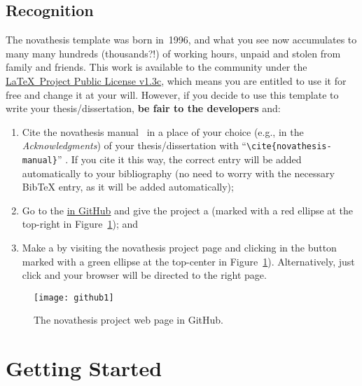\subsection{Recognition}
\label{sub:recognition}

\ntindex[Recognition]{}

The \gls{novathesis} template was born in~1996, and what you see now accumulates to many many hundreds (thousands?!) of working hours, unpaid and stolen from family and friends.  This work is available to the community under the \href{LaTeX project public license}{\LaTeX\ Project Public License v1.3c}, which means you are entitled to use it for free and change it at your will.  However, if you decide to use this template to write your thesis/dissertation, \textbf{be fair to the developers} and:
\begin{enumerate}
  \item {} Cite the \gls{novathesis} manual~\cite{novathesis-manual} in a place of your choice (e.g., in the \emph{Acknowledgments}) of your thesis/dissertation with “\verb!\cite{novathesis-manual}!” .  If you cite it this way, the correct entry will be added automatically to your bibliography (no need to worry with the necessary BibTeX entry, as it will be added automatically);
  \item Go to the
\href{https://github.com/joaomlourenco/novathesis}{ in GitHub} and give the project a  (marked with a red ellipse at the top-right in Figure~\ref{fig:github}); and
  \item Make a  by visiting the \gls{novathesis} project page and clicking in the button marked with a green ellipse at the top-center in Figure~\ref{fig:github}).  Alternatively, just click \href{https://www.paypal.com/donate/?hosted_button_id=8WA8FRVMB78W8}{} and your browser will be directed to the right page.
\end{enumerate}

\begin{figure}[htbp]
    \centering
    \texttt{[image: github1]}
    \caption{The \gls{novathesis} project web page in GitHub.}
    \label{fig:github}
\end{figure}


\section{Getting Started}
\label{sec:getting_started}

